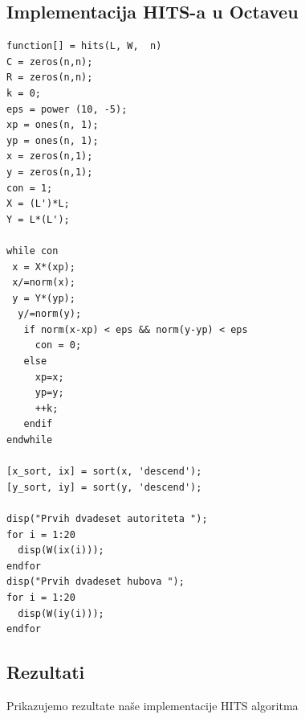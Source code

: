 \documentclass[11pt]{article}
\begin{document}
\subsection{Implementacija HITS-a u Octaveu}
\begin{lstlisting}
function[] = hits(L, W,  n)
C = zeros(n,n);
R = zeros(n,n);
k = 0; 
eps = power (10, -5); 
xp = ones(n, 1); 
yp = ones(n, 1);
x = zeros(n,1);
y = zeros(n,1);
con = 1;
X = (L')*L; 
Y = L*(L');

while con
 x = X*(xp);
 x/=norm(x);
 y = Y*(yp);
  y/=norm(y);
   if norm(x-xp) < eps && norm(y-yp) < eps
     con = 0;
   else
     xp=x;
     yp=y;
     ++k;
   endif
endwhile

[x_sort, ix] = sort(x, 'descend');
[y_sort, iy] = sort(y, 'descend');

disp("Prvih dvadeset autoriteta ");
for i = 1:20
  disp(W(ix(i)));
endfor
disp("Prvih dvadeset hubova ");
for i = 1:20 
  disp(W(iy(i)));
endfor
\end{lstlisting}

\subsection{Rezultati}
Prikazujemo rezultate naše implementacije HITS algoritma
\end{document}
